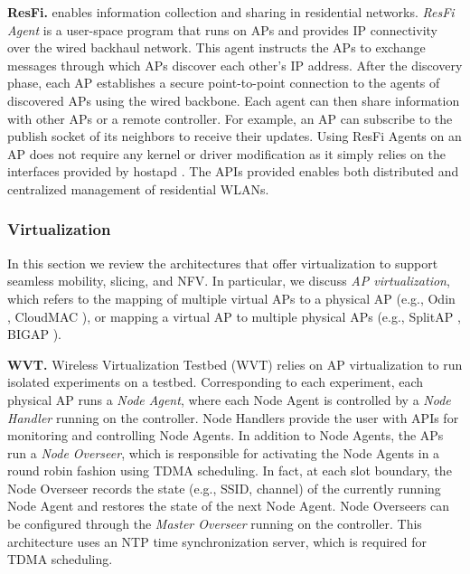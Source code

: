 \textbf{ResFi.}
\cite{ResFi} enables information collection and sharing in residential networks. 
\textit{ResFi Agent} is a user-space program that runs on APs and provides IP connectivity over the wired backhaul network.
This agent instructs the APs to exchange messages through which APs discover each other's IP address.
After the discovery phase, each AP establishes a secure point-to-point connection to the agents of discovered APs using the wired backbone.
Each agent can then share information with other APs or a remote controller.
For example, an AP can subscribe to the publish socket of its neighbors to receive their updates.
Using ResFi Agents on an AP does not require any kernel or driver modification as it simply relies on the interfaces provided by hostapd \cite{hostapd}.
The APIs provided enables both distributed and centralized management of residential WLANs.




\subsubsection{\textbf{Virtualization}}
\label{AP-virtualization}
In this section we review the architectures that offer virtualization to support seamless mobility, slicing, and NFV.
In particular, we discuss \textit{AP virtualization}, which refers to the mapping of multiple virtual APs to a physical AP (e.g., Odin \cite{Odin}, CloudMAC \cite{CloudMAC3}), or mapping a virtual AP to multiple physical APs (e.g., SplitAP \cite{SplitAP}, BIGAP \cite{BIGAP}).



\textbf{WVT.} Wireless Virtualization Testbed (WVT) \cite {smith2007wireless} relies on AP virtualization to run isolated experiments on a testbed.
Corresponding to each experiment, each physical AP runs a \textit{Node Agent}, where each Node Agent is controlled by a \textit{Node Handler} running on the controller. 
Node Handlers provide the user with APIs for monitoring and controlling Node Agents.
In addition to Node Agents, the APs run a \textit{Node Overseer}, which is responsible for activating the Node Agents in a round robin fashion using TDMA scheduling.
In fact, at each slot boundary, the Node Overseer records the state (e.g., SSID, channel) of the currently running Node Agent and restores the state of the next Node Agent.
Node Overseers can be configured through the \textit{Master Overseer} running on the controller.
This architecture uses an NTP time synchronization server, which is required for TDMA scheduling.




